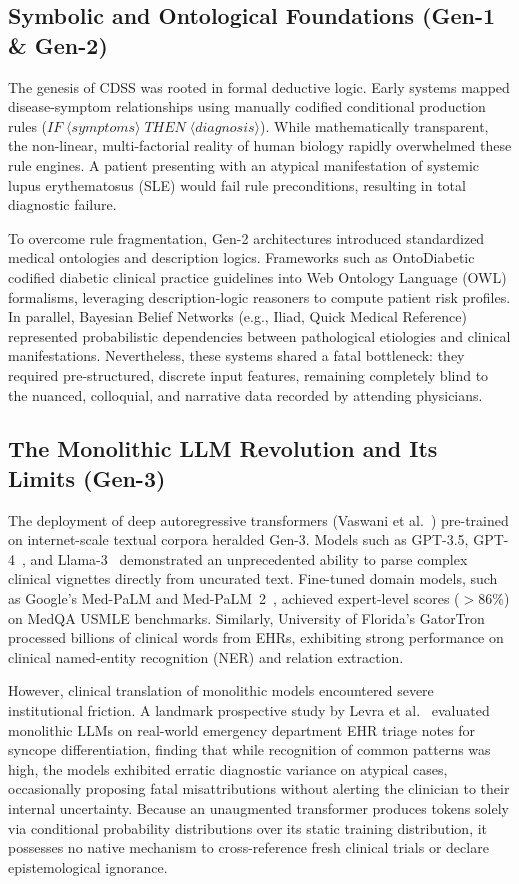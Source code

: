 \documentclass[conference]{IEEEtran}
\begin{document}
\subsection{Symbolic and Ontological Foundations (Gen-1 \& Gen-2)}
The genesis of CDSS was rooted in formal deductive logic. Early systems mapped disease-symptom relationships using manually codified conditional production rules ($IF \; \langle symptoms \rangle \; THEN \; \langle diagnosis \rangle$). While mathematically transparent, the non-linear, multi-factorial reality of human biology rapidly overwhelmed these rule engines. A patient presenting with an atypical manifestation of systemic lupus erythematosus (SLE) would fail rule preconditions, resulting in total diagnostic failure.

To overcome rule fragmentation, Gen-2 architectures introduced standardized medical ontologies and description logics. Frameworks such as OntoDiabetic~\cite{sherimon2016ontodiabetic} codified diabetic clinical practice guidelines into Web Ontology Language (OWL) formalisms, leveraging description-logic reasoners to compute patient risk profiles. In parallel, Bayesian Belief Networks (e.g., Iliad, Quick Medical Reference) represented probabilistic dependencies between pathological etiologies and clinical manifestations. Nevertheless, these systems shared a fatal bottleneck: they required pre-structured, discrete input features, remaining completely blind to the nuanced, colloquial, and narrative data recorded by attending physicians.

\subsection{The Monolithic LLM Revolution and Its Limits (Gen-3)}
The deployment of deep autoregressive transformers (Vaswani et al.~\cite{vaswani2017attention}) pre-trained on internet-scale textual corpora heralded Gen-3. Models such as GPT-3.5, GPT-4~\cite{achiam2023gpt}, and Llama-3~\cite{dubey2024llama} demonstrated an unprecedented ability to parse complex clinical vignettes directly from uncurated text. Fine-tuned domain models, such as Google's Med-PaLM and Med-PaLM~2~\cite{singhal2023large}, achieved expert-level scores ($>86\%$) on MedQA USMLE benchmarks. Similarly, University of Florida's GatorTron~\cite{yang2022large} processed billions of clinical words from EHRs, exhibiting strong performance on clinical named-entity recognition (NER) and relation extraction.

However, clinical translation of monolithic models encountered severe institutional friction. A landmark prospective study by Levra et al.~\cite{levra2025large} evaluated monolithic LLMs on real-world emergency department EHR triage notes for syncope differentiation, finding that while recognition of common patterns was high, the models exhibited erratic diagnostic variance on atypical cases, occasionally proposing fatal misattributions without alerting the clinician to their internal uncertainty. Because an unaugmented transformer produces tokens solely via conditional probability distributions over its static training distribution, it possesses no native mechanism to cross-reference fresh clinical trials or declare epistemological ignorance.
\end{document}
